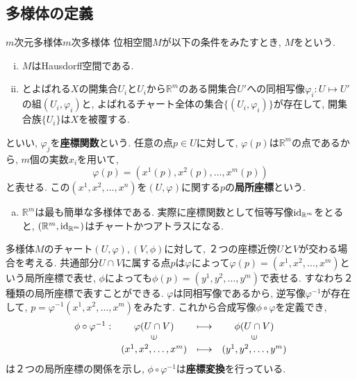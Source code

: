 \documentclass[../main.tex]{subfiles}
\begin{document}
    \subsection{多様体の定義}
        \begin{dfn}{$m$次元多様体}{$m$次多様体}
            位相空間$M$が以下の条件をみたすとき, $M$をという.
            \begin{enumerate}[(i)]
                \item $M$はHausdorff空間である.
                \item {}とよばれる$X$の開集合$U_i$と$U_i$から$\mathbb{R}^m$のある開集合$U'$への同相写像$\varphi_i: U \mapsto U'$の組$(U_i,\varphi_i)$と, よばれるチャート全体の集合$\{(U_i,\varphi_i)\}$が存在して, 開集合族$\{U_i\}$は$X$を被覆する.
            \end{enumerate}
        \end{dfn}
        といい,  $\varphi_j$を\textbf{座標関数}という.
        任意の点$p \in U$に対して, $\varphi(p)$は$\mathbb{R}^m$の点であるから, $m$個の実数$x_i$を用いて,
        \begin{equation}
            \varphi(p) = (x^1(p),x^2(p),\ldots,x^m(p))
        \end{equation}
        と表せる. この$(x^1,x^2,\ldots,x^n)$を$(U,\varphi)$に関する$p$の\textbf{局所座標}という.

        \begin{exm}{}{}
            \begin{enumerate}[(a)]
                \item $\mathbb{R}^m$は最も簡単な多様体である. 実際に座標関数として恒等写像$\operatorname{id}_{\mathbb{R}^m}$をとると, $(\mathbb{R}^m, \operatorname{id}_{\mathbb{R}^m})$はチャートかつアトラスになる.
            \end{enumerate}
        \end{exm}

        多様体$M$のチャート$(U,\varphi),(V,\phi)$に対して, ２つの座標近傍$U$と$V$が交わる場合を考える. 共通部分$U \cap V$に属する点$p$は$\varphi$によって$\varphi(p)=(x^1,x^2,\ldots,x^m)$という局所座標で表せ, $\phi$によっても$\phi(p)=(y^1,y^2,\ldots,y^m)$で表せる. すなわち２種類の局所座標で表すことができる.  $\varphi$は同相写像であるから, 逆写像$\varphi^{-1}$が存在して, $p=\varphi^{-1}(x^1,x^2,\ldots,x^m)$をみたす. これから合成写像$\phi\circ\varphi$を定義でき,
        \begin{equation}
            \begin{array}{cccc}
                \phi\circ\varphi^{-1}:
                    &\varphi(U \cap V) & \longmapsto & \phi(U \cap V) \\
                    & \rotatebox{90}{$\in$} & & \rotatebox{90}{$\in$} \\
                    &(x^1,x^2,\ldots,x^m) &\longmapsto & (y^1,y^2,\ldots,y^m)
            \end{array}
        \end{equation}
        は２つの局所座標の関係を示し, $\phi\circ\varphi^{-1}$は\textbf{座標変換}を行っている.
\end{document}
